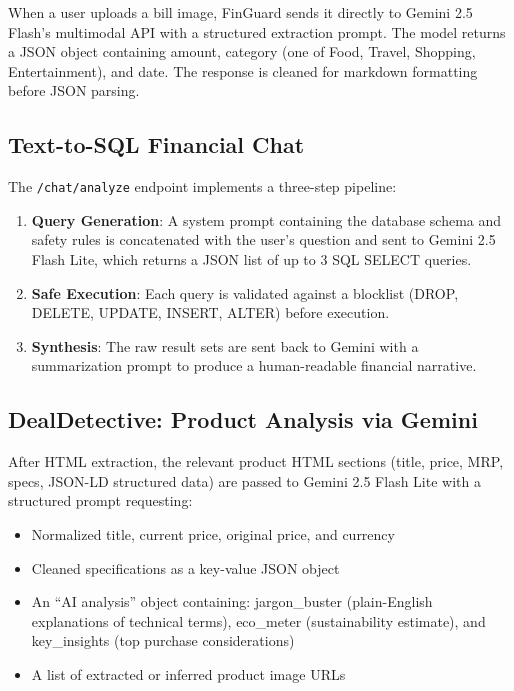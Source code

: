 \documentclass[]{IEEEtran}
\begin{document}
When a user uploads a bill image, FinGuard sends it directly to Gemini 2.5 Flash's multimodal API with a structured extraction prompt. The model returns a JSON object containing amount, category (one of Food, Travel, Shopping, Entertainment), and date. The response is cleaned for markdown formatting before JSON parsing.

\subsection{Text-to-SQL Financial Chat}

The \texttt{/chat/analyze} endpoint implements a three-step pipeline:
\begin{enumerate}
    \item \textbf{Query Generation}: A system prompt containing the database schema and safety rules is concatenated with the user's question and sent to Gemini 2.5 Flash Lite, which returns a JSON list of up to 3 SQL SELECT queries.
    \item \textbf{Safe Execution}: Each query is validated against a blocklist (DROP, DELETE, UPDATE, INSERT, ALTER) before execution.
    \item \textbf{Synthesis}: The raw result sets are sent back to Gemini with a summarization prompt to produce a human-readable financial narrative.
\end{enumerate}

\subsection{DealDetective: Product Analysis via Gemini}

After HTML extraction, the relevant product HTML sections (title, price, MRP, specs, JSON-LD structured data) are passed to Gemini 2.5 Flash Lite with a structured prompt requesting:
\begin{itemize}
    \item Normalized title, current price, original price, and currency
    \item Cleaned specifications as a key-value JSON object
    \item An ``AI analysis'' object containing: jargon\_buster (plain-English explanations of technical terms), eco\_meter (sustainability estimate), and key\_insights (top purchase considerations)
    \item A list of extracted or inferred product image URLs
\end{itemize}
\end{document}
